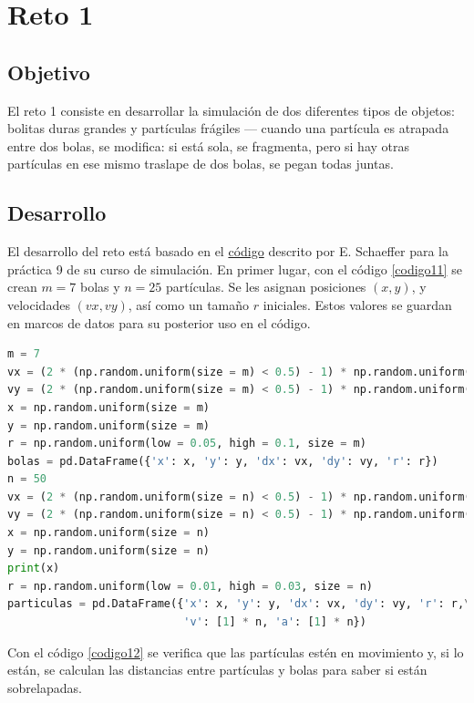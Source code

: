\documentclass{report}
\begin{document}
\chapter{Reto 1}

\section{Objetivo}
El reto 1 consiste en desarrollar la simulaci\'on de dos diferentes tipos de objetos: bolitas duras grandes y partículas frágiles — cuando una partícula es atrapada entre dos bolas, se modifica: si está sola, se fragmenta, pero si hay otras partículas en ese mismo traslape de dos bolas, se pegan todas juntas.

\section{Desarrollo}
El desarrollo del reto est\'a basado en el \href{https://satuelisa.github.io/simulation/p9.html}{c\'odigo} descrito por E. Schaeffer para la pr\'actica 9 de su curso de simulaci\'on. En primer lugar, con el c\'odigo \ref{codigo11} se crean $m=7$ bolas y $n=25$ part\'iculas. Se les asignan posiciones $(x, y)$, y velocidades $(vx, vy)$, as\'i como un tama\~no $r$ iniciales. Estos valores se guardan en marcos de datos para su posterior uso en el c\'odigo.

\begin{lstlisting}[caption=Creaci\'on de Bolas y Part\'iculas, label=codigo11, language=Python]
m = 7
vx = (2 * (np.random.uniform(size = m) < 0.5) - 1) * np.random.uniform(low = 0.01, high = 0.04, size = m)
vy = (2 * (np.random.uniform(size = m) < 0.5) - 1) * np.random.uniform(low = 0.01, high = 0.04, size = m)
x = np.random.uniform(size = m)
y = np.random.uniform(size = m)
r = np.random.uniform(low = 0.05, high = 0.1, size = m)
bolas = pd.DataFrame({'x': x, 'y': y, 'dx': vx, 'dy': vy, 'r': r})
n = 50
vx = (2 * (np.random.uniform(size = n) < 0.5) - 1) * np.random.uniform(low = 0.02, high = 0.05, size = n)
vy = (2 * (np.random.uniform(size = n) < 0.5) - 1) * np.random.uniform(low = 0.02, high = 0.05, size = n)
x = np.random.uniform(size = n)
y = np.random.uniform(size = n)
print(x)
r = np.random.uniform(low = 0.01, high = 0.03, size = n)
particulas = pd.DataFrame({'x': x, 'y': y, 'dx': vx, 'dy': vy, 'r': r,\
                           'v': [1] * n, 'a': [1] * n})
\end{lstlisting}

Con el c\'odigo \ref{codigo12} se verifica que las part\'iculas est\'en en movimiento y, si lo est\'an, se calculan las distancias entre part\'iculas y bolas para saber si est\'an sobrelapadas.
\end{document}
